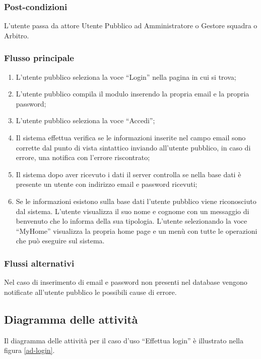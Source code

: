 	\subsubsection*{Post-condizioni}
	L'utente passa da attore Utente Pubblico ad Amministratore o Gestore squadra o Arbitro.
	
	\subsubsection*{Flusso principale}
	
	\begin{enumerate}
		
		\item
		L'utente pubblico seleziona la voce ``Login'' nella pagina in cui si trova;
		
		\item
		L'utente pubblico compila il modulo inserendo la propria email e la propria password;
		
		\item
		L'utente pubblico seleziona la voce ``Accedi'';
		
		\item
		Il sistema effettua verifica se le informazioni inserite nel campo email sono corrette dal punto di vista sintattico inviando all'utente pubblico, in caso di errore, una notifica con l'errore riscontrato;
		
		\item
		Il sistema dopo aver ricevuto i dati il server controlla se nella base dati è presente un utente con indirizzo email e password ricevuti;
		
		\item
		Se le informazioni esistono sulla base dati l'utente pubblico viene riconosciuto dal sistema. L'utente visualizza il suo nome e cognome con un messaggio di benvenuto che lo informa della sua tipologia. L'utente selezionando la voce ``MyHome'' visualizza la propria home page e un menù con tutte le operazioni che può eseguire sul sistema.
		
	\end{enumerate}
	
	\subsubsection*{Flussi alternativi}
	Nel caso di inserimento di email e password non presenti nel database vengono notificate all'utente pubblico le possibili cause di errore.
	
	\subsection*{Diagramma delle attività}
	Il diagramma delle attività per il caso d'uso ``Effettua login'' è illustrato nella figura \vref{ad-login}.
	
